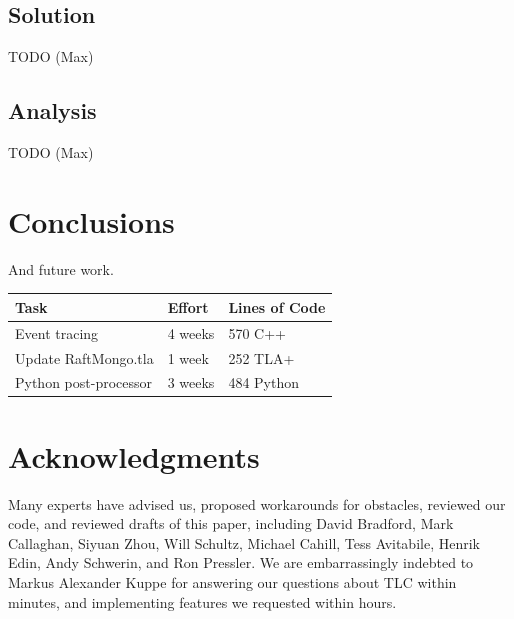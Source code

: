 \documentclass{vldb}
\begin{document}
\subsection{Solution}
\label{subsec:mbt_solution}
TODO (Max)
\subsection{Analysis}
\label{subsec:mbt_analysis}
TODO (Max)

\section{Conclusions}
\label{sec:conclusions}

And future work.


\begin{center}
\begin{tabular}{ | m{11em} | m{5em}| m{6em} | } 
\hline
Task & Effort & Lines of Code \\  
\hline
Event tracing & 4 weeks & 570 C++ \\ 
Update RaftMongo.tla & 1 week & 252 TLA+\\ 
Python post-processor & 3 weeks & 484 Python \\ 
\hline
\end{tabular}
\end{center}


\balance
\section{Acknowledgments}
\label{sec:acknowledgments}
Many experts have advised us, proposed workarounds for obstacles, reviewed our code, and reviewed drafts of this paper, including 
David Bradford,
Mark Callaghan,
Siyuan Zhou,
Will Schultz,
Michael Cahill,
Tess Avitabile,
Henrik Edin,
Andy Schwerin,
and Ron Pressler.
We are embarrassingly indebted to Markus Alexander Kuppe for answering our questions about TLC within minutes, and implementing features we requested within hours.


\end{document}
